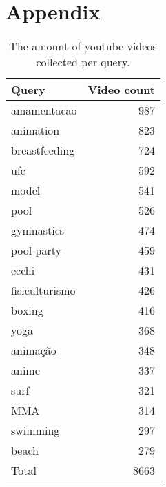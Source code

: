 \newpage

\chapter{Appendix}\label{chap:appendix}

\begin{table}
\centering
\caption{The amount of youtube videos collected per query.}
\label{tab:non-yt-count}
\begin{tabular}{|l|r|} 
\hline
Query  & \multicolumn{1}{l|}{Video count}  \\ 
\hline
amamentacao    & 987                               \\ 
\hline
animation      & 823                               \\ 
\hline
breastfeeding  & 724                               \\ 
\hline
ufc            & 592                               \\ 
\hline
model          & 541                               \\ 
\hline
pool           & 526                               \\ 
\hline
gymnastics     & 474                               \\ 
\hline
pool party     & 459                               \\ 
\hline
ecchi          & 431                               \\ 
\hline
fisiculturismo & 426                               \\ 
\hline
boxing         & 416                               \\ 
\hline
yoga           & 368                               \\ 
\hline
animação       & 348                               \\ 
\hline
anime          & 337                               \\ 
\hline
surf           & 321                               \\ 
\hline
MMA            & 314                               \\ 
\hline
swimming       & 297                               \\ 
\hline
beach          & 279                               \\ 
\hline
Total          & 8663                              \\
\hline
\end{tabular}
\end{table}